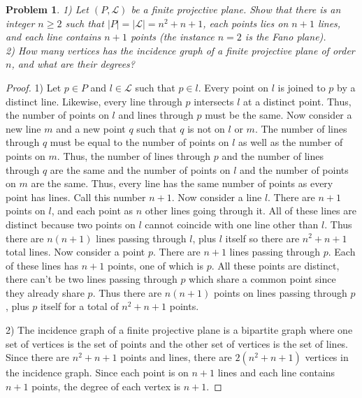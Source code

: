 \documentclass{article}
\newtheorem{problem}{Problem}
\begin{document}
\begin{flushleft}
\begin{problem}
1) Let $(P, \mathcal{L})$ be a finite projective plane. Show that there is an integer $n \geq 2$ such that $|P| = |\mathcal{L}| = n^2 + n + 1$, each points lies on $n+1$ lines, and each line contains $n+1$ points (the instance $n=2$ is the Fano plane).\\
2) How many vertices has the incidence graph of a finite projective plane of order $n$, and what are their degrees?
\end{problem}
\begin{proof}
1) Let $p \in P$ and $l \in \mathcal{L}$ such that $p \in l$. Every point on $l$ is joined to $p$ by a distinct line. Likewise, every line through $p$ intersects $l$ at a distinct point. Thus, the number of points on $l$ and lines through $p$ must be the same. Now consider a new line $m$ and a new point $q$ such that $q$ is not on $l$ or $m$. The number of lines through $q$ must be equal to the number of points on $l$ as well as the number of points on $m$. Thus, the number of lines through $p$ and the number of lines through $q$ are the same and the number of points on $l$ and the number of points on $m$ are the same. Thus, every line has the same number of points as every point has lines. Call this number $n+1$. Now consider a line $l$. There are $n+1$ points on $l$, and each point as $n$ other lines going through it. All of these lines are distinct because two points on $l$ cannot coincide with one line other than $l$. Thus there are $n(n+1)$ lines passing through $l$, plus $l$ itself so there are $n^2 + n + 1$ total lines. Now consider a point $p$. There are $n+1$ lines passing through $p$. Each of these lines has $n+1$ points, one of which is $p$. All these points are distinct, there can't be two lines passing through $p$ which share a common point since they already share $p$. Thus there are $n(n+1)$ points on lines passing through $p$, plus $p$ itself for a total of $n^2 + n + 1$ points.\newline

2) The incidence graph of a finite projective plane is a bipartite graph where one set of vertices is the set of points and the other set of vertices is the set of lines. Since there are $n^2+n+1$ points and lines, there are $2(n^2+n+1)$ vertices in the incidence graph. Since each point is on $n+1$ lines and each line contains $n+1$ points, the degree of each vertex is $n+1$.
\end{proof}


\end{flushleft}
\end{document}
